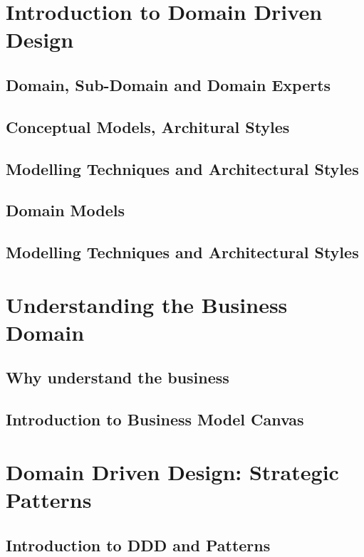 \documentclass[a4paper, 11pt]{book}
\begin{document}
    \chapter{Introduction to Domain Driven Design}


    \section{Domain, Sub-Domain and Domain Experts}


    \section{Conceptual Models, Architural Styles}


    \section{Modelling Techniques and Architectural Styles}


    \section{Domain Models}


    \section{Modelling Techniques and Architectural Styles}


    \chapter{Understanding the Business Domain}


    \section{Why understand the business}


    \section{Introduction to Business Model Canvas}


    \chapter{Domain Driven Design: Strategic Patterns}


    \section{Introduction to DDD and Patterns}
\end{document}
